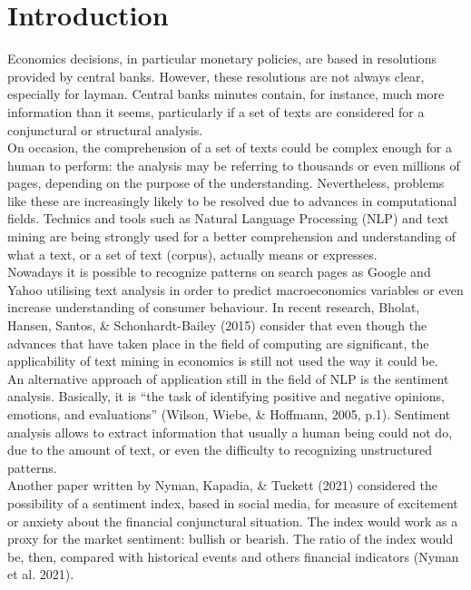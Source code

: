 \chapter{\textbf{Introduction}}  \label{introduction}

Economics decisions, in particular monetary policies, are based in resolutions provided by central banks. However, these resolutions are not always clear, especially for layman. Central banks minutes contain, for instance, much more information than it seems, particularly if a set of texts are considered for a conjunctural or structural analysis.\\

On occasion, the comprehension of a set of texts could be complex enough for a human to perform: the analysis may be referring to thousands or even millions of pages, depending on the purpose of the understanding. Nevertheless, problems like these are increasingly likely to be resolved due to advances in computational fields. Technics and tools such as Natural Language Processing (NLP) and text mining are being strongly used for a better comprehension and understanding of what a text, or a set of text (corpus), actually means or expresses.\\

Nowadays it is possible to recognize patterns on search pages as Google and Yahoo utilising text analysis in order to predict macroeconomics variables or even increase understanding of consumer behaviour. In recent research, Bholat, Hansen, Santos, \& Schonhardt-Bailey (2015) consider that even though the advances that have taken place in the field of computing are significant, the applicability of text mining in economics is still not used the way it could be.\\

An alternative approach of application still in the field of NLP is the sentiment analysis. Basically, it is “the task of identifying positive and negative opinions, emotions, and evaluations” (Wilson, Wiebe, \& Hoffmann, 2005, p.1). Sentiment analysis allows to extract information that usually a human being could not do, due to the amount of text, or even the difficulty to recognizing unstructured patterns.\\	

Another paper written by Nyman, Kapadia, \& Tuckett (2021) considered the possibility of a sentiment index, based in social media, for measure of excitement or anxiety about the financial conjunctural situation. The index would work as a proxy for the market sentiment: bullish or bearish. The ratio of the index would be, then, compared with historical events and others financial indicators (Nyman et al. 2021).\\

